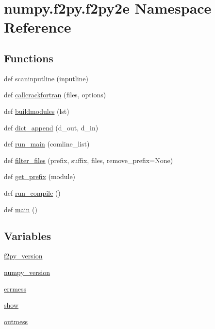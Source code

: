 \hypertarget{namespacenumpy_1_1f2py_1_1f2py2e}{}\section{numpy.\+f2py.\+f2py2e Namespace Reference}
\label{namespacenumpy_1_1f2py_1_1f2py2e}
\subsection*{Functions}
\begin{DoxyCompactItemize}
\item 
def \hyperlink{namespacenumpy_1_1f2py_1_1f2py2e_a827c2fe95ae3ccb72d439b94d742d68e}{scaninputline} (inputline)
\item 
def \hyperlink{namespacenumpy_1_1f2py_1_1f2py2e_af9fb4dd099c7fea33d1fa5acd72d8830}{callcrackfortran} (files, options)
\item 
def \hyperlink{namespacenumpy_1_1f2py_1_1f2py2e_a87c69837a50df4103e22e4014fd653f5}{buildmodules} (lst)
\item 
def \hyperlink{namespacenumpy_1_1f2py_1_1f2py2e_a547d10bcf8aaaff9fa49c133dab40187}{dict\+\_\+append} (d\+\_\+out, d\+\_\+in)
\item 
def \hyperlink{namespacenumpy_1_1f2py_1_1f2py2e_ae513d0dc3b3445462e7a67809be21bd9}{run\+\_\+main} (comline\+\_\+list)
\item 
def \hyperlink{namespacenumpy_1_1f2py_1_1f2py2e_a72d3a475283a6a04fa4270e70592b501}{filter\+\_\+files} (prefix, suffix, files, remove\+\_\+prefix=None)
\item 
def \hyperlink{namespacenumpy_1_1f2py_1_1f2py2e_a9ac16fe9b4a3d3483b62d46297b6fd22}{get\+\_\+prefix} (module)
\item 
def \hyperlink{namespacenumpy_1_1f2py_1_1f2py2e_ade01a1e67b80a034d30623eb51ba665b}{run\+\_\+compile} ()
\item 
def \hyperlink{namespacenumpy_1_1f2py_1_1f2py2e_a2d42aea7e69ac0771b3e155698f5dfa4}{main} ()
\end{DoxyCompactItemize}
\subsection*{Variables}
\begin{DoxyCompactItemize}
\item 
\hyperlink{namespacenumpy_1_1f2py_1_1f2py2e_a7a871c21a5526bb1643ac355df17b8bc}{f2py\+\_\+version}
\item 
\hyperlink{namespacenumpy_1_1f2py_1_1f2py2e_a5dfb0d3ddc900ad3e32aafb0b3d6f4b6}{numpy\+\_\+version}
\item 
\hyperlink{namespacenumpy_1_1f2py_1_1f2py2e_a334da0912173f2789d7c88633b70d73d}{errmess}
\item 
\hyperlink{namespacenumpy_1_1f2py_1_1f2py2e_afd8efcde659f68a7b49eb5d6cae6eead}{show}
\item 
\hyperlink{namespacenumpy_1_1f2py_1_1f2py2e_a90725a3d9f268192e974ab015894a428}{outmess}
\end{DoxyCompactItemize}



